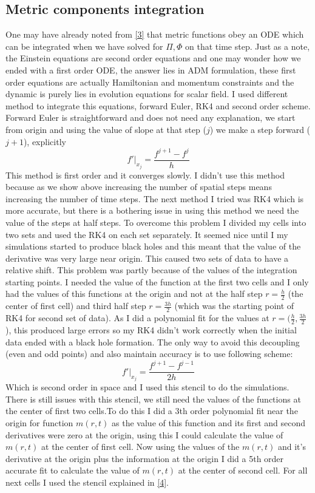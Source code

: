 \documentclass[a4paper,11pt]{article}
\begin{document}
 \subsection{Metric components integration}
 One may have already noted from \ref{3} that metric functions obey an ODE which can be integrated when we have solved for $\Pi,\Phi$ on that time step. Just as a note, the Einstein equations are second order equations and one may wonder how we ended with a first order ODE, the answer lies in ADM formulation, these first order equations are actually Hamiltonian and momentum constraints and the dynamic is purely lies in evolution equations for scalar field. I used different method to integrate this equations, forward Euler, RK4 and second order scheme. Forward Euler is straightforward and does not need any explanation, we start from origin and using the value of slope at that step ($j$) we make a step forward ($j+1$), explicitly
 \begin{equation}
 	f'\vert_{x_j}=\frac{f^{j+1}-f^{j}}{h}
 \end{equation}
 This method is first order and it converges slowly. I didn't use this method because as we show above increasing the number of spatial steps means increasing the number of time steps. The next method I tried was RK4 which is more accurate, but there is a bothering issue in using this method we need the value of the steps at half steps. To overcome this problem I divided my cells into two sets and used the RK4 on each set separately. It seemed nice until I my simulations started to produce black holes and this meant that the value of the derivative was very large near origin. This caused two sets of data to have a relative shift. This problem was partly because of the values of the integration starting points. I needed the value of the function at the first two cells and I only had the values of this functions at the origin and not at the half step $r=\frac{h}{2}$ (the center of first cell)  and third  half step   $r=\frac{3h}{2}$ (which was the starting point of RK4 for second set of data). As I did a polynomial fit for the values at $r=(\frac{h}{2},\frac{3h}{2}$), this produced large errors so my RK4 didn't work correctly when the initial data ended with a black hole formation. The only way to avoid this decoupling (even and odd points) and also maintain accuracy is to use following scheme:
 \begin{equation}\label{4}
 	f'\vert_{x_j}=\frac{f^{j+1}-f^{j-1}}{2h}
 \end{equation}
 Which is second order in space and I used this stencil to do the simulations.
 There is still issues with this stencil, we still need the values of the functions at the center of first two cells.To do this I did a 3th order polynomial fit near the origin for function $m(r,t)$ as the value of this function and its first and second  derivatives were zero at the origin, using this I could calculate the value of $m(r,t)$ at the center of first cell. Now using the values of the $m(r,t)$ and it's derivative at the origin plus the information at the origin I did a 5th order accurate fit to calculate the value of $m(r,t)$ at the center of second cell. For all next cells I used the stencil explained in \ref{4}.
\end{document}

